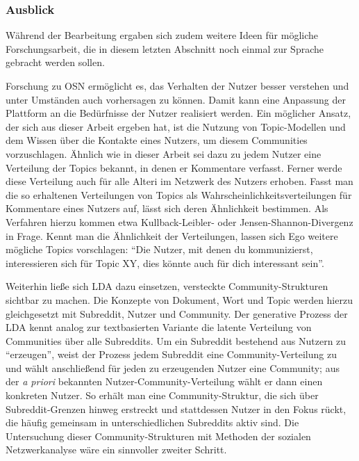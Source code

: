\documentclass[11pt,a4paper,twoside]{article}
\begin{document}
\hypertarget{ausblick}{%
\subsubsection{Ausblick}\label{ausblick}}

Während der Bearbeitung ergaben sich zudem weitere Ideen für mögliche
Forschungsarbeit, die in diesem letzten Abschnitt noch einmal zur
Sprache gebracht werden sollen.

Forschung zu OSN ermöglicht es, das Verhalten der Nutzer besser
verstehen und unter Umständen auch vorhersagen zu können. Damit kann
eine Anpassung der Plattform an die Bedürfnisse der Nutzer realisiert
werden. Ein möglicher Ansatz, der sich aus dieser Arbeit ergeben hat,
ist die Nutzung von Topic-Modellen und dem Wissen über die Kontakte
eines Nutzers, um diesem Communities vorzuschlagen. Ähnlich wie in
dieser Arbeit sei dazu zu jedem Nutzer eine Verteilung der Topics
bekannt, in denen er Kommentare verfasst. Ferner werde diese Verteilung
auch für alle Alteri im Netzwerk des Nutzers erhoben. Fasst man die so
erhaltenen Verteilungen von Topics als Wahrscheinlichkeitsverteilungen
für Kommentare eines Nutzers auf, lässt sich deren Ähnlichkeit
bestimmen. Als Verfahren hierzu kommen etwa Kullback-Leibler- oder
Jensen-Shannon-Divergenz in Frage. Kennt man die Ähnlichkeit der
Verteilungen, lassen sich Ego weitere mögliche Topics vorschlagen:
\enquote{Die Nutzer, mit denen du kommunizierst, interessieren sich für
Topic XY, dies könnte auch für dich interessant sein}.

Weiterhin ließe sich LDA dazu einsetzen, versteckte Community-Strukturen
sichtbar zu machen. Die Konzepte von Dokument, Wort und Topic werden
hierzu gleichgesetzt mit Subreddit, Nutzer und Community. Der generative
Prozess der LDA kennt analog zur textbasierten Variante die latente
Verteilung von Communities über alle Subreddits. Um ein Subreddit
bestehend aus Nutzern zu \enquote{erzeugen}, weist der Prozess jedem
Subreddit eine Community-Verteilung zu und wählt anschließend für jeden
zu erzeugenden Nutzer eine Community; aus der \emph{a priori} bekannten
Nutzer-Community-Verteilung wählt er dann einen konkreten Nutzer. So
erhält man eine Community-Struktur, die sich über Subreddit-Grenzen
hinweg erstreckt und stattdessen Nutzer in den Fokus rückt, die häufig
gemeinsam in unterschiedlichen Subreddits aktiv sind. Die Untersuchung
dieser Community-Strukturen mit Methoden der sozialen Netzwerkanalyse
wäre ein sinnvoller zweiter Schritt.

\cleardoublepage
\end{document}
